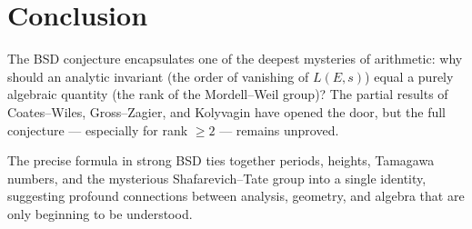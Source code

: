 \documentclass[12pt,a4paper]{article}
\theoremstyle{remark}
\begin{document}
\section{Conclusion}

The BSD conjecture encapsulates one of the deepest mysteries of arithmetic: why should
an analytic invariant (the order of vanishing of $L(E,s)$) equal a purely algebraic
quantity (the rank of the Mordell--Weil group)?  The partial results of Coates--Wiles,
Gross--Zagier, and Kolyvagin have opened the door, but the full conjecture — especially
for rank $\geq 2$ — remains unproved.

The precise formula in strong BSD ties together periods, heights, Tamagawa numbers, and
the mysterious Shafarevich--Tate group into a single identity, suggesting profound
connections between analysis, geometry, and algebra that are only beginning to be
understood.
\end{document}
